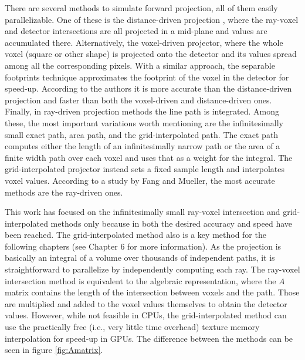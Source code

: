 There are several methods to simulate forward projection, all of them easily parallelizable. One of these is the distance-driven projection \cite{BrunoDeMan}\cite{schlifske2016fast}, where the ray-voxel and detector intersections are all projected in a mid-plane and values are accumulated there. Alternatively, the voxel-driven projector\cite{Du2017}, where the whole voxel (square or other shape\cite{lewitt1992alternatives}) is projected onto the detector and its values spread among all the corresponding pixels. With a similar approach, the separable footprints technique\cite{long20103d}\cite{wu2011gpu} approximates the footprint of the voxel in the detector for speed-up.  According to the authors it is more accurate than the distance-driven projection and faster than both the voxel-driven and distance-driven ones. Finally, in ray-driven projection\cite{siddon1985fast}\cite{xu2010fast}\cite{chou2011fast} methods the line path is integrated. Among these, the most important variations worth mentioning are the infinitesimally small exact path, area path, and the grid-interpolated path. The exact path computes either the length of an infinitesimally narrow path or the area of a finite width path over each voxel and uses that as a weight for the integral. The grid-interpolated projector instead sets a fixed sample length and interpolates voxel values. According to a study by Fang and Mueller\cite{1625152}, the most accurate methods are the ray-driven ones.

This work has focused on the infinitesimally small ray-voxel intersection and grid-interpolated methods only because in both the desired accuracy and speed have been reached. The grid-interpolated method also is a key method for the following chapters (see Chapter 6 for more information). As the projection is basically an integral of a volume over thousands of independent paths, it is straightforward to parallelize by independently computing each ray. The ray-voxel intersection method is equivalent to the algebraic representation, where the $A$ matrix contains the length of the intersection between voxels and the path. Those are multiplied and added to the voxel values themselves to obtain the detector values. However, while not feasible in CPUs, the grid-interpolated method can use the practically free (i.e., very little time overhead) texture memory interpolation for speed-up in GPUs. The difference between the methods can be seen in figure \ref{fig:Amatrix}. 

